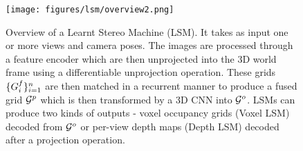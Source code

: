 \begin{figure}
\texttt{[image: figures/lsm/overview2.png]}
\caption{Overview of a Learnt Stereo Machine (LSM). It takes as input one or more views and camera poses. The images are processed through a feature encoder which are then unprojected into the 3D world frame using a differentiable unprojection operation. These grids $\mathcal\{{G}^f_i\}_{i=1}^n$ are then matched in a recurrent manner to produce a fused grid $\mathcal{G}^p$ which is then transformed by a 3D CNN into $\mathcal{G}^o$. LSMs can produce two kinds of outputs - voxel occupancy grids (Voxel LSM) decoded from $\mathcal{G}^o$ or per-view depth maps (Depth LSM) decoded after a projection operation.} 
\end{figure}